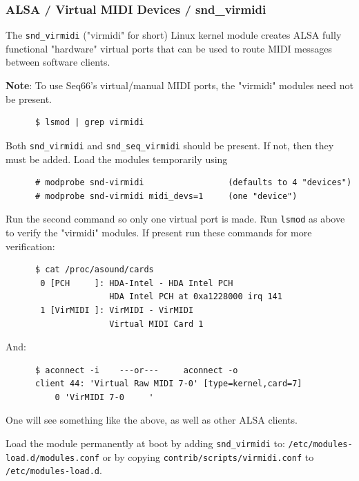 \subsubsection{ALSA / Virtual MIDI Devices / snd\_virmidi}
\label{subsubsec:alsa_virtual_midi_devices_snd_virmidi}

   The \texttt{snd\_virmidi} ("virmidi" for short)
   Linux kernel module creates ALSA fully functional
   "hardware" virtual ports that can be used
   to route MIDI messages between software clients.

   \textbf{Note}: To use Seq66's virtual/manual MIDI ports, the "virmidi"
   modules need not be present. 

   \begin{verbatim}
      $ lsmod | grep virmidi
   \end{verbatim}

   Both \texttt{snd\_virmidi} and \texttt{snd\_seq\_virmidi}
   should be present.
   If not, then they must be added.
   Load the modules temporarily using

   \begin{verbatim}
      # modprobe snd-virmidi                 (defaults to 4 "devices")
      # modprobe snd-virmidi midi_devs=1     (one "device")
   \end{verbatim}

   Run the second command so only one virtual port is made.
   Run \texttt{lsmod} as above to verify the "virmidi" modules.
   If present run these commands for more verification:

   \begin{verbatim}
      $ cat /proc/asound/cards
       0 [PCH     ]: HDA-Intel - HDA Intel PCH
                     HDA Intel PCH at 0xa1228000 irq 141
       1 [VirMIDI ]: VirMIDI - VirMIDI
                     Virtual MIDI Card 1
   \end{verbatim}

   And:

   \begin{verbatim}
      $ aconnect -i    ---or---     aconnect -o
      client 44: 'Virtual Raw MIDI 7-0' [type=kernel,card=7]
          0 'VirMIDI 7-0     '
   \end{verbatim}

   One will see something like the above, as well as other ALSA
   clients.

   Load the module permanently at boot by adding
   \texttt{snd\_virmidi} to:
   \texttt{/etc/modules-load.d/modules.conf}
   or by copying \texttt{contrib/scripts/virmidi.conf}
   to 
   \texttt{/etc/modules-load.d}.

